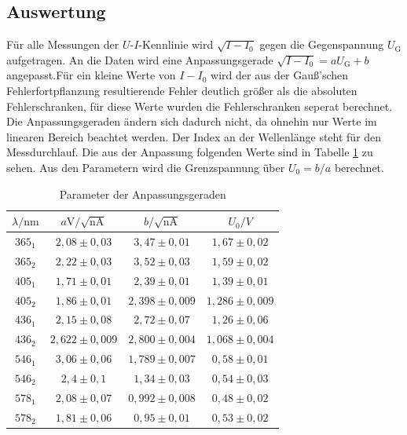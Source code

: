 \subsection{Auswertung}
Für alle Messungen der $U$-$I$-Kennlinie wird $\sqrt{I-I_0}$ gegen die Gegenspannung $U_\mathrm{G}$ aufgetragen. An die Daten wird eine Anpassungsgerade $\sqrt{I-I_0}=aU_\mathrm{G}+b$ angepasst.Für ein kleine Werte von $I-I_0$ wird der aus der Gauß'schen Fehlerfortpflanzung resultierende Fehler deutlich größer als die absoluten Fehlerschranken, für diese Werte wurden die Fehlerschranken seperat berechnet. Die Anpassungsgeraden ändern sich dadurch nicht, da ohnehin nur Werte im linearen Bereich beachtet werden. Der Index an der Wellenlänge steht für den Messdurchlauf. Die aus der Anpassung folgenden Werte sind in Tabelle \ref{tab:photoeffekt} zu sehen. Aus den Parametern wird die Grenzspannung über $U_0=b/a$ berechnet. 

\newpage

\begin{table}[h]
  \centering
    \begin{tabular}{c c c c}
      \toprule
      $\lambda/\mathrm{nm}$ & $a\mathrm{V}/ \sqrt{\mathrm{nA}}$ & $b/\sqrt{\mathrm{nA}}$ & $U_0/V$\\
      \midrule
      $365_1$ & $2,08 \pm 0,03 $ &$3,47 \pm 0,01 $ & $1,67 \pm 0,02$\\
      $365_2$ & $2,22 \pm 0,03 $ &$3,52 \pm 0,03  $ & $1,59 \pm 0,02$\\
      $405_1$ & $1,71 \pm 0,01 $ &$2,39 \pm 0,01 $ & $1,39 \pm 0,01$\\
      $405_2$ & $1,86 \pm 0,01 $ &$2,398 \pm 0,009$ & $1,286 \pm 0,009$\\
      $436_1$ & $2,15 \pm 0,08 $ &$2,72 \pm 0,07  $ & $1,26 \pm 0,06  $\\
      $436_2$ & $2,622 \pm 0,009$ &$2,800 \pm 0,004$ & $1,068 \pm 0,004 $\\
      $546_1$ & $3,06 \pm 0,06 $ &$1,789 \pm 0,007$ & $0,58 \pm 0,01$\\
      $546_2$ & $2,4 \pm 0,1  $ &$1,34 \pm 0,03  $ & $0,54 \pm 0,03$\\
      $578_1$ & $2,08 \pm 0,07 $ &$0,992 \pm 0,008$ & $0,48 \pm 0,02$\\
      $578_2$ & $1,81 \pm 0,06 $ &$0,95 \pm 0,01$ & $0,53 \pm 0,02$\\
      \bottomrule
    \end{tabular}
    \caption{Parameter der Anpassungsgeraden}
    \label{tab:photoeffekt}
\end{table}

